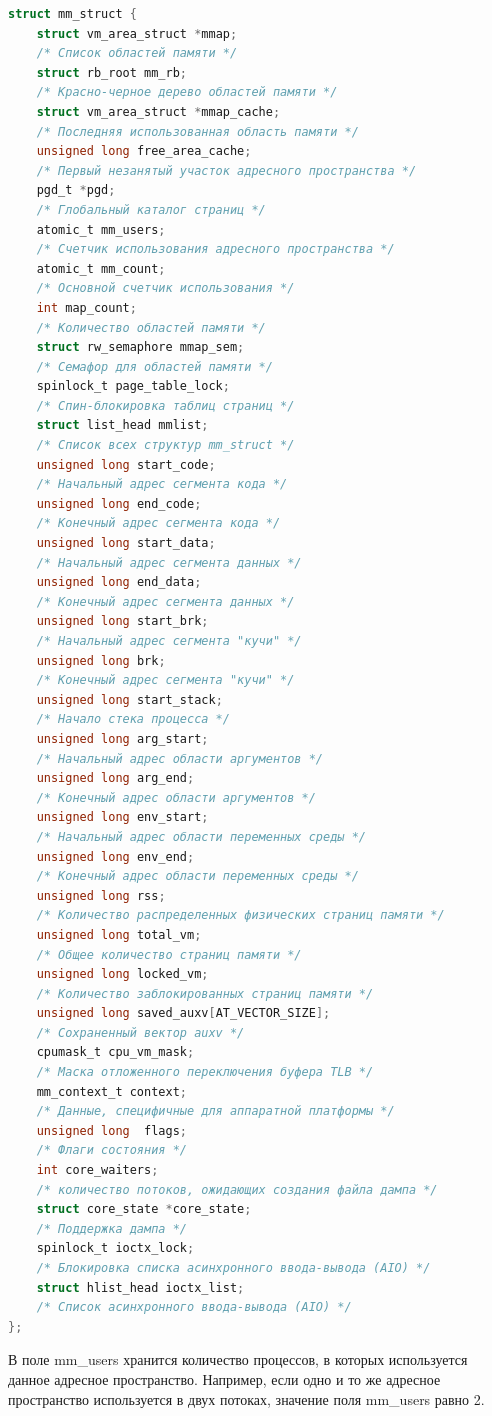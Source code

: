 \begin{lstlisting}[language=c, label=some-code, caption=Структура mm\_struct]
struct mm_struct {
	struct vm_area_struct *mmap; 
	/* Список областей памяти */
	struct rb_root mm_rb; 
	/* Красно-черное дерево областей памяти */
	struct vm_area_struct *mmap_cache;
	/* Последняя использованная область памяти */
	unsigned long free_area_cache; 
	/* Первый незанятый участок адресного пространства */
	pgd_t *pgd;
	/* Глобальный каталог страниц */
	atomic_t mm_users; 
	/* Счетчик использования адресного пространства */
	atomic_t mm_count; 
	/* Основной счетчик использования */
	int map_count; 
	/* Количество областей памяти */
	struct rw_semaphore mmap_sem; 
	/* Семафор для областей памяти */
	spinlock_t page_table_lock; 
	/* Спин-блокировка таблиц страниц */
	struct list_head mmlist;
	/* Список всех структур mm_struct */
	unsigned long start_code;
	/* Начальный адрес сегмента кода */
	unsigned long end_code;
	/* Конечный адрес сегмента кода */
	unsigned long start_data;
	/* Начальный адрес сегмента данных */
	unsigned long end_data;
	/* Конечный адрес сегмента данных */
	unsigned long start_brk;
	/* Начальный адрес сегмента "кучи" */
	unsigned long brk;
	/* Конечный адрес сегмента "кучи" */
	unsigned long start_stack;
	/* Начало стека процесса */
	unsigned long arg_start; 
	/* Начальный адрес области аргументов */
	unsigned long arg_end;
	/* Конечный адрес области аргументов */
	unsigned long env_start; 
	/* Начальный адрес области переменных среды */
	unsigned long env_end;
	/* Конечный адрес области переменных среды */
	unsigned long rss;
	/* Количество распределенных физических страниц памяти */
	unsigned long total_vm; 
	/* Общее количество страниц памяти */
	unsigned long locked_vm; 
	/* Количество заблокированных страниц памяти */
	unsigned long saved_auxv[AT_VECTOR_SIZE]; 
	/* Сохраненный вектор auxv */
	cpumask_t cpu_vm_mask;
	/* Маска отложенного переключения буфера TLB */
	mm_context_t context; 
	/* Данные, специфичные для аппаратной платформы */
	unsigned long  flags;
	/* Флаги состояния */
	int core_waiters;
	/* количество потоков, ожидающих создания файла дампа */
	struct core_state *core_state; 
	/* Поддержка дампа */
	spinlock_t ioctx_lock; 
	/* Блокировка списка асинхронного ввода-вывода (AIO) */
	struct hlist_head ioctx_list; 
	/* Список асинхронного ввода-вывода (AIO) */
};
\end{lstlisting}

В поле mm\_users хранится количество процессов, в которых используется данное
адресное пространство. Например, если одно и то же адресное пространство 
используется в двух потоках, значение поля mm\_users равно 2.

